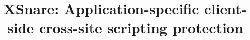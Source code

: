 \documentclass[letterpaper,twocolumn,10pt]{article}
\newcommand{\sys}[0]{XSnare\xspace}
\begin{document}
	
\date{}

\title{\Large \bf \sys: Application-specific client-side cross-site scripting protection}


\maketitle




\acresetall	%











%



\end{document}
